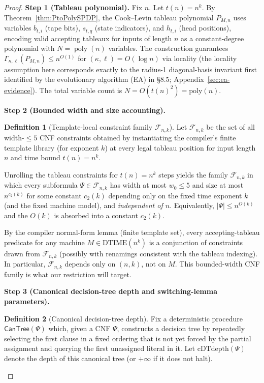 \documentclass[12pt]{article}
\theoremstyle{definition}
\newtheorem{definition}{Definition}
\theoremstyle{definition}
\theoremstyle{remark}
\theoremstyle{remark}
\begin{document}
\begin{proof}
\textbf{Step 1 (Tableau polynomial).}
Fix $n$. Let $t(n)=n^k$. By Theorem~\ref{thm:PtoPolySPDP}, the Cook--Levin tableau polynomial $P_{M,n}$ uses variables $b_{t,i}$ (tape bits), $s_{t,q}$ (state indicators), and $h_{t,i}$ (head positions), encoding valid accepting tableaux for inputs of length $n$ as a constant-degree polynomial with $N=\operatorname{poly}(n)$ variables. The construction guarantees $\Gamma_{\kappa,\ell}(P_{M,n}) \leq n^{O(1)}$ for $(\kappa,\ell) = O(\log n)$ via locality (the locality assumption here corresponds exactly to the radius-1 diagonal-basis invariant first identified by the evolutionary algorithm (EA) in \S8.5; Appendix~\ref{sec:ea-evidence}). The total variable count is $N = O(t(n)^2) = \mathrm{poly}(n)$.

\textbf{Step 2 (Bounded width and size accounting).}

\begin{definition}[Template-local constraint family $\mathcal{F}_{n,k}$]
\label{def:Fnk}
Let $\mathcal{F}_{n,k}$ be the set of all width-$\le 5$ CNF constraints obtained by instantiating the
compiler's finite template library (for exponent $k$) at every legal tableau position for
input length $n$ and time bound $t(n)=n^k$.
\end{definition}

Unrolling the tableau constraints for $t(n)=n^k$ steps yields the family
$\mathcal{F}_{n,k}$ in which every subformula $\Psi\in\mathcal{F}_{n,k}$ has width at most
$w_0\le 5$ and size at most $n^{c_2(k)}$ for some constant $c_2(k)$ depending only on the
fixed time exponent $k$ (and the fixed machine model), and \emph{independent of $n$}.
Equivalently, $|\Psi|\le n^{O(k)}$ and the $O(k)$ is absorbed into a constant $c_2(k)$.

By the compiler normal-form lemma (finite template set), every accepting-tableau predicate
for any machine $M\in\mathrm{DTIME}(n^k)$ is a conjunction of constraints drawn from $\mathcal{F}_{n,k}$
(possibly with renamings consistent with the tableau indexing). In particular, $\mathcal{F}_{n,k}$
depends only on $(n,k)$, not on $M$. This bounded-width CNF family is what our restriction will target.

\textbf{Step 3 (Canonical decision-tree depth and switching-lemma parameters).}

\begin{definition}[Canonical decision-tree depth]
\label{def:canonical-dtdepth}
Fix a deterministic procedure $\mathsf{CanTree}(\Psi)$ which, given a CNF $\Psi$,
constructs a decision tree by repeatedly selecting the first clause in a fixed ordering
that is not yet forced by the partial assignment and querying the first unassigned literal in it.
Let $\mathrm{cDTdepth}(\Psi)$ denote the depth of this canonical tree (or $+\infty$ if it does not halt).
\end{definition}


\end{proof}
\end{document}
